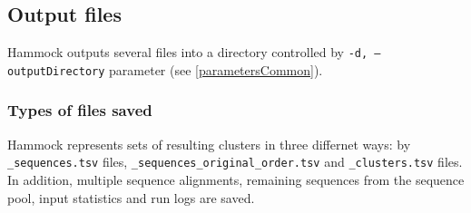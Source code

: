 \documentclass[11pt, a4paper, twoside, titlepage]{article}
\begin{document}
\subsection{Output files}

Hammock outputs several files into a directory controlled by \texttt{-d, --outputDirectory} parameter (see \ref{parametersCommon}).

\subsubsection{Types of files saved} \label{filesSaved}
Hammock represents sets of resulting clusters in three differnet ways: by \texttt{\_sequences.tsv} files, \texttt{\_sequences\_original\_order.tsv} and \texttt{\_clusters.tsv} files. In addition, multiple sequence alignments, remaining sequences from the sequence pool, input statistics and run logs are saved.
\end{document}
